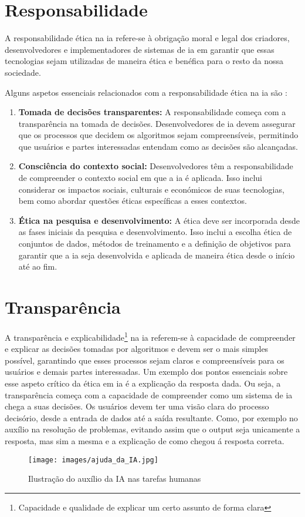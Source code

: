 \documentclass[a4paper, 11pt, onecolumn, oneside]{report}
\begin{document}
\section{Responsabilidade}
A responsabilidade ética na \ac{ia} refere-se à obrigação moral e legal dos criadores, desenvolvedores e implementadores de sistemas de \ac{ia} em garantir que essas tecnologias sejam utilizadas de maneira ética e benéfica para o resto da nossa sociedade. 
\par
Alguns aspetos essenciais relacionados com a responsabilidade ética na \ac{ia} são \cite{responsabilidade}:
\begin{enumerate}
    \item \textbf{Tomada de decisões transparentes:} A responsabilidade começa com a transparência na tomada de decisões. Desenvolvedores de \ac{ia} devem assegurar que os processos que decidem os algoritmos sejam compreensíveis, permitindo que usuários e partes interessadas entendam como as decisões são alcançadas. 
    \item \textbf{Consciência do contexto social:} Desenvolvedores têm a responsabilidade de compreender o contexto social em que a \ac{ia} é aplicada. Isso inclui considerar os impactos sociais, culturais e económicos de suas tecnologias, bem como abordar questões éticas específicas a esses contextos. 
    \item \textbf{Ética na pesquisa e desenvolvimento: }A ética deve ser incorporada desde as fases iniciais da pesquisa e desenvolvimento. Isso inclui a escolha ética de conjuntos de dados, métodos de treinamento e a definição de objetivos para garantir que a \ac{ia} seja desenvolvida e aplicada de maneira ética desde o início até ao fim.
\end{enumerate}

\section{Transparência}
A transparência e explicabilidade\footnote{Capacidade e qualidade de explicar um certo assunto de forma clara} na \ac{ia} referem-se à capacidade de compreender e explicar as decisões tomadas por algoritmos e devem ser o mais simples possível, garantindo que esses processos sejam claros e compreensíveis para os usuários e demais partes interessadas. Um exemplo dos pontos essenciais sobre esse aspeto crítico da ética em \ac{ia} é a explicação da resposta dada. Ou seja, a transparência começa com a capacidade de compreender como um sistema de \ac{ia} chega a suas decisões. Os usuários devem ter uma visão clara do processo decisório, desde a entrada de dados até a saída resultante. Como, por exemplo no auxílio na resolução de problemas, evitando assim que o output seja unicamente a resposta, mas sim a mesma e a explicação de como chegou á resposta correta.
\par
\begin{figure}
    \centering
    \texttt{[image: images/ajuda\_da\_IA.jpg]}
    \caption{Ilustração do auxílio da IA nas tarefas humanas\cite{i43}}
    \label{ajuda_da_IA}
\end{figure}
\end{document}
